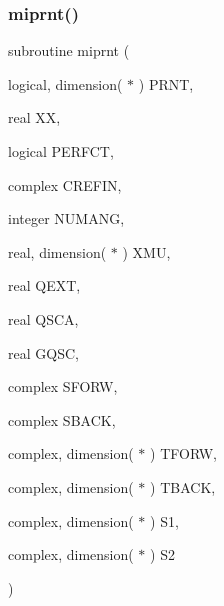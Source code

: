 \subsubsection{\texorpdfstring{miprnt()}{miprnt()}}
{\footnotesize\ttfamily subroutine miprnt (\begin{DoxyParamCaption}\item[{logical, dimension( $\ast$ )}]{P\+R\+NT,  }\item[{real}]{XX,  }\item[{logical}]{P\+E\+R\+F\+CT,  }\item[{complex}]{C\+R\+E\+F\+IN,  }\item[{integer}]{N\+U\+M\+A\+NG,  }\item[{real, dimension( $\ast$ )}]{X\+MU,  }\item[{real}]{Q\+E\+XT,  }\item[{real}]{Q\+S\+CA,  }\item[{real}]{G\+Q\+SC,  }\item[{complex}]{S\+F\+O\+RW,  }\item[{complex}]{S\+B\+A\+CK,  }\item[{complex, dimension( $\ast$ )}]{T\+F\+O\+RW,  }\item[{complex, dimension( $\ast$ )}]{T\+B\+A\+CK,  }\item[{complex, dimension( $\ast$ )}]{S1,  }\item[{complex, dimension( $\ast$ )}]{S2 }\end{DoxyParamCaption})}

\mbox{\label{wiscombe__miev__1_2_m_i_e_v0no_p_8f_a42db51d8245d25e068704071519e108f}} 
